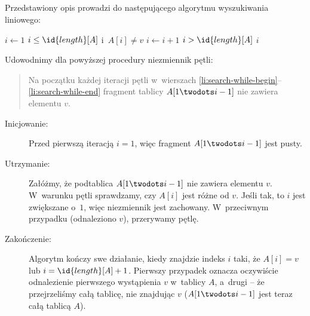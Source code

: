 \subsection{} %
Przedstawiony opis prowadzi do następującego algorytmu wyszukiwania liniowego:
\begin{codebox}
\li	$i\gets 1$
\li	\While $i\le \id{length}[A]$ i~$A[i]\ne v$ \label{li:search-while-begin}
\li		\Do
			$i\gets i+1$
		\End \label{li:search-while-end}
\li	\If $i>\id{length}[A]$
\li		\Then
			\Return {}
\li		\Else
			\Return $i$
		\End
\end{codebox}
Udowodnimy dla powyższej procedury niezmiennik pętli:
\begin{quote}
Na początku każdej iteracji pętli  w~wierszach \ref{li:search-while-begin}--\ref{li:search-while-end} fragment tablicy $A[1\twodots i-1]$ nie zawiera elementu $v$.
\end{quote}
\begin{description}
	\item[Inicjowanie:] Przed pierwszą iteracją $i=1$, więc fragment $A[1\twodots i-1]$ jest pusty.
	\item[Utrzymanie:] Załóżmy, że podtablica $A[1\twodots i-1]$ nie zawiera elementu $v$. W~warunku pętli  sprawdzamy, czy $A[i]$ jest różne od $v$. Jeśli tak, to $i$ jest zwiększane o~$1$, więc niezmiennik jest zachowany. W~przeciwnym przypadku (odnaleziono $v$), przerywamy pętlę.
	\item[Zakończenie:] Algorytm kończy swe działanie, kiedy znajdzie indeks $i$ taki, że $A[i]=v$ lub $i=\id{length}[A]+1$. Pierwszy przypadek oznacza oczywiście odnalezienie pierwszego wystąpienia $v$ w~tablicy $A$, a~drugi -- że przejrzeliśmy całą tablicę, nie znajdując $v$ ($A[1\twodots i-1]$ jest teraz całą tablicą $A$).
\end{description}

